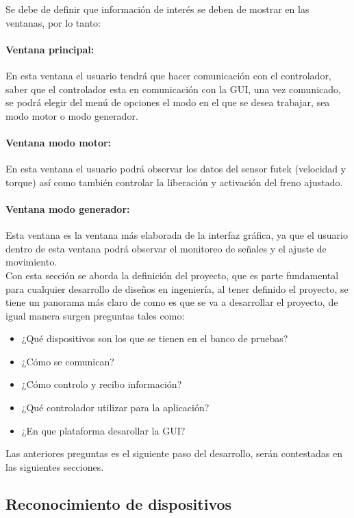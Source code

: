 \documentclass[12pt,titlepage]{article}
\begin{document}
Se debe de definir que información de interés se deben de mostrar en las ventanas, por lo tanto:  \\
\paragraph*{Ventana principal:} En esta ventana el usuario tendrá que hacer comunicación con el controlador, saber que el controlador esta en comunicación con la GUI, una vez comunicado, se podrá elegir del menú de opciones el modo en el que se desea trabajar, sea modo motor o modo generador. 
\paragraph*{Ventana modo motor:} En esta ventana el usuario podrá observar los datos del sensor futek (velocidad y torque) así como también controlar la liberación y activación del freno ajustado. 
\paragraph*{Ventana modo generador:} Esta ventana es la ventana más elaborada de la interfaz gráfica, ya que el usuario dentro de esta ventana podrá observar el monitoreo de señales y el ajuste de movimiento. \\[0.8cm]

Con esta sección se aborda la definición del proyecto, que es parte fundamental para cualquier desarrollo de diseños en ingeniería, al tener definido el proyecto, se tiene un panorama más claro de como es que se va a desarrollar el proyecto, de igual manera surgen preguntas tales como: \\

\begin{itemize}
\item ¿Qué dispositivos son los que se tienen en el banco de pruebas?
\item ¿Cómo se comunican?
\item ¿Cómo controlo y recibo información?
\item ¿Qué controlador utilizar para la aplicación?
\item ¿En que plataforma desarollar la GUI? 
\end{itemize}

Las anteriores preguntas es el siguiente paso del desarrollo, serán contestadas en las siguientes secciones. \\
\newpage
\subsection{Reconocimiento de dispositivos}
\end{document}
